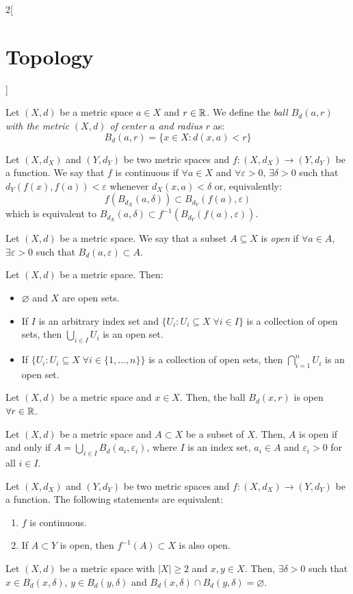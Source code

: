 \documentclass[../../../main.tex]{subfiles}
\begin{document}
\begin{multicols}{2}[\section{Topology}]
  \begin{definition}
    Let $(X,d)$ be a metric space $a\in X$ and $r\in\mathbb{R}$. We define the \textit{ball $B_d(a,r)$ with the metric $(X,d)$ of center $a$ and radius $r$} as: $$B_d(a,r)=\{x\in X:d(x,a)<r\}$$
  \end{definition}
  \begin{definition}
    Let $(X,d_X)$ and $(Y,d_Y)$ be two metric spaces and $f:(X,d_X)\rightarrow(Y,d_Y)$ be a function. We say that $f$ is continuous if $\forall a\in X$ and $\forall\varepsilon>0$, $\exists\delta>0$ such that $d_Y(f(x),f(a))<\varepsilon$ whenever $d_X(x,a)<\delta$ or, equivalently: $$f(B_{d_X}(a,\delta))\subset B_{d_Y}(f(a),\varepsilon)$$ which is equivalent to $B_{d_X}(a,\delta)\subset f^{-1}\left(B_{d_Y}(f(a),\varepsilon)\right)$.
  \end{definition}
  \begin{definition}
    Let $(X,d)$ be a metric space. We say that a subset $A\subseteq X$ is \textit{open} if $\forall a\in A$, $\exists\varepsilon>0$ such that $B_d(a,\varepsilon)\subset A$.
  \end{definition}
  \begin{prop}
    Let $(X,d)$ be a metric space. Then:
    \begin{itemize}
      \item $\varnothing$ and $X$ are open sets.
      \item If $I$ is an arbitrary index set and $\{U_i:U_i\subseteq X\;\forall i\in I\}$ is a collection of open sets, then $\bigcup_{i\in I}U_i$ is an open set.
      \item If $\{U_i:U_i\subseteq X\;\forall i\in \{1,\ldots,n\}\}$ is a collection of open sets, then $\bigcap_{i=1}^nU_i$ is an open set.
    \end{itemize}
  \end{prop}
  \begin{prop}
    Let $(X,d)$ be a metric space and $x\in X$. Then, the ball $B_d(x,r)$ is open $\forall r\in\mathbb{R}$.
  \end{prop}
  \begin{prop}
    Let $(X,d)$ be a metric space and $A\subset X$ be a subset of $X$. Then, $A$ is open if and only if $A=\bigcup_{i\in I}B_d(a_i,\varepsilon_i)$, where $I$ is an index set, $a_i\in A$ and $\varepsilon_i>0$ for all $i\in I$.
  \end{prop}
  \begin{theorem}
    Let $(X,d_X)$ and $(Y,d_Y)$ be two metric spaces and $f:(X,d_X)\rightarrow(Y,d_Y)$ be a function. The following statements are equivalent:
    \begin{enumerate}
      \item $f$ is continuous.
      \item If $A\subset Y$ is open, then $f^{-1}(A)\subset X$ is also open.
    \end{enumerate}
  \end{theorem}
  \begin{prop}
    Let $(X,d)$ be a metric space with $|X|\geq 2$ and $x,y\in X$. Then, $\exists\delta>0$ such that $x\in B_d(x,\delta)$, $y\in B_d(y,\delta)$ and $B_d(x,\delta)\cap B_d(y,\delta)=\varnothing$.
  \end{prop}

\end{multicols}
\end{document}
